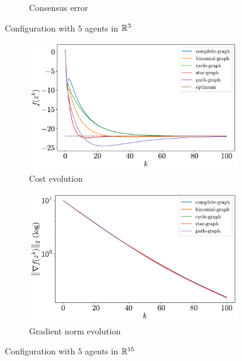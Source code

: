 \documentclass[a4paper,11pt,oneside]{book}
\begin{document}
\begin{figure}[H]
\begin{subfigure}[t]{0.49\textwidth}
            \caption{Consensus error}
      \end{subfigure}
      \caption{Configuration with $5$ agents in ${\mathbb{R}}^{3}$}
      \label{fig:quadratic_5_3}
\end{figure}

\begin{figure}[H]
      \centering
      \begin{subfigure}[t]{0.49\textwidth}
            \centering
            \includegraphics[width=\linewidth]{./figs/quadratic/cost_5_15_100.pdf} 
            \caption{Cost evolution}
      \end{subfigure}
      \hfill
      \begin{subfigure}[t]{0.49\textwidth}
            \centering
            \includegraphics[width=\linewidth]{./figs/quadratic/gradient_5_15_100.pdf} 
            \caption{Gradient norm evolution}
      \end{subfigure}
      \caption{Configuration with $5$ agents in ${\mathbb{R}}^{15}$}
      \label{fig:quadratic_5_15}
\end{figure}
\end{document}
